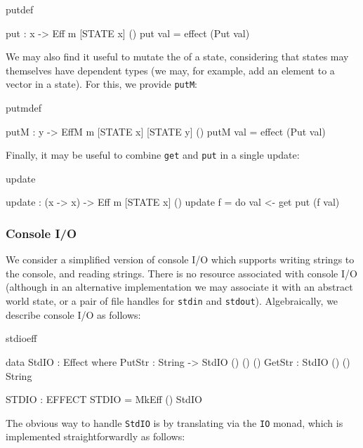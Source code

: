 \begin{SaveVerbatim}{putdef}

put : x -> Eff m [STATE x] ()
put val = effect (Put val)

\end{SaveVerbatim}

\noindent
We may also find it useful to mutate the  of a state, considering
that states may themselves have dependent types (we may, for example, add
an element to a vector in a state). For this, we provide \texttt{putM}:

\begin{SaveVerbatim}{putmdef}

putM : y -> EffM m [STATE x] [STATE y] ()
putM val = effect (Put val)

\end{SaveVerbatim}

\noindent
Finally, it may be useful to combine \texttt{get} and \texttt{put} in a single
update:

\begin{SaveVerbatim}{update}

update : (x -> x) -> Eff m [STATE x] ()
update f = do val <- get
              put (f val) 

\end{SaveVerbatim}

\subsubsection{Console I/O}

We consider a simplified version of console I/O which supports writing strings
to the console, and reading strings. There is no resource associated with
console I/O (although in an alternative implementation we may associate it
with an abstract world state, or a pair of file handles for \texttt{stdin}
and \texttt{stdout}). Algebraically, we describe console I/O as follows:

\begin{SaveVerbatim}{stdioeff}

data StdIO : Effect where
     PutStr : String -> StdIO () () ()
     GetStr : StdIO () () String

STDIO : EFFECT
STDIO = MkEff () StdIO

\end{SaveVerbatim}

\noindent
The obvious way to handle \texttt{StdIO} is by translating via the \texttt{IO}
monad, which is implemented straightforwardly as follows:

